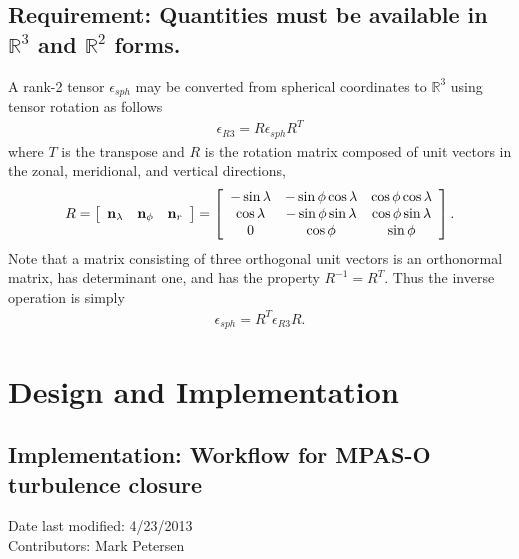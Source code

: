 \documentclass[11pt]{report}
\begin{document}
\section{Requirement: Quantities must be available in $\mathbb{R}^3$ and $\mathbb{R}^2$ forms.}
A rank-2 tensor $\epsilon_{sph}$ may be converted from spherical coordinates to $\mathbb{R}^3$ using tensor rotation as follows
\begin{eqnarray}
\epsilon_{R3} = R \epsilon_{sph} R^T
\end{eqnarray}
where $T$ is the transpose and $R$ is the rotation matrix composed of unit vectors in the zonal, meridional, and vertical directions,
\begin{eqnarray}
R = \left[ \begin{array}{ccc}
{\bf n}_\lambda & {\bf n}_\phi & {\bf n}_r
\end{array}\right]
= \left[ \begin{array}{ccc}
-\sin\lambda & -\sin\phi\cos\lambda & \cos\phi\cos\lambda \\
 \cos\lambda & -\sin\phi\sin\lambda & \cos\phi\sin\lambda \\
    0     &  \cos\phi         & \sin\phi
\end{array}\right].
\end{eqnarray}
Note that a matrix consisting of three orthogonal unit vectors is an orthonormal matrix, has determinant one, and has the property $R^{-1}=R^T$.  Thus the inverse operation is simply
\begin{eqnarray}
\epsilon_{sph} = R^T \epsilon_{R3} R.
\end{eqnarray}


\chapter{Design and Implementation}

\section{Implementation: Workflow for MPAS-O turbulence closure}
Date last modified: 4/23/2013 \\
Contributors: Mark Petersen \\
\end{document}
